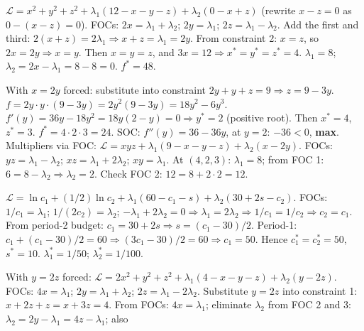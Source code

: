 \begin{solutions}
  \item $\mathcal{L} = x^2 + y^2 + z^2 + \lambda_1(12 - x - y - z)
        + \lambda_2(0 - x + z)$ (rewrite $x - z = 0$ as
        $0 - (x - z) = 0$). FOCs: $2 x = \lambda_1 + \lambda_2$;
        $2 y = \lambda_1$; $2 z = \lambda_1 - \lambda_2$. Add the first
        and third: $2(x + z) = 2 \lambda_1 \Rightarrow
        x + z = \lambda_1 = 2 y$. From constraint 2: $x = z$, so
        $2 x = 2 y \Rightarrow x = y$. Then $x = y = z$, and
        $3 x = 12 \Rightarrow x^* = y^* = z^* = 4$. $\lambda_1 = 8$;
        $\lambda_2 = 2 x - \lambda_1 = 8 - 8 = 0$. $f^* = 48$.
  \item With $x = 2 y$ forced: substitute into constraint
        $2 y + y + z = 9 \Rightarrow z = 9 - 3 y$.
        $f = 2 y \cdot y \cdot (9 - 3 y) = 2 y^2(9 - 3 y)
        = 18 y^2 - 6 y^3$.
        $f'(y) = 36 y - 18 y^2 = 18 y(2 - y) = 0 \Rightarrow y^* = 2$
        (positive root). Then $x^* = 4$, $z^* = 3$.
        $f^* = 4 \cdot 2 \cdot 3 = 24$. SOC: $f''(y) = 36 - 36 y$, at
        $y = 2$: $-36 < 0$, \textbf{max}. Multipliers via FOC:
        $\mathcal{L} = x y z + \lambda_1(9 - x - y - z)
        + \lambda_2(x - 2 y)$. FOCs: $y z = \lambda_1 - \lambda_2$;
        $x z = \lambda_1 + 2 \lambda_2$; $x y = \lambda_1$. At
        $(4, 2, 3)$: $\lambda_1 = 8$; from FOC 1:
        $6 = 8 - \lambda_2 \Rightarrow \lambda_2 = 2$. Check FOC 2:
        $12 = 8 + 2 \cdot 2 = 12$. \checkmark
  \item $\mathcal{L} = \ln c_1 + (1/2) \ln c_2
        + \lambda_1(60 - c_1 - s) + \lambda_2(30 + 2 s - c_2)$. FOCs:
        $1/c_1 = \lambda_1$; $1/(2 c_2) = \lambda_2$;
        $-\lambda_1 + 2 \lambda_2 = 0 \Rightarrow
        \lambda_1 = 2 \lambda_2 \Rightarrow 1/c_1 = 1/c_2 \Rightarrow
        c_2 = c_1$. From period-2 budget:
        $c_1 = 30 + 2 s \Rightarrow s = (c_1 - 30)/2$. Period-1:
        $c_1 + (c_1 - 30)/2 = 60 \Rightarrow (3 c_1 - 30)/2 = 60
        \Rightarrow c_1 = 50$. Hence $c_1^* = c_2^* = 50$, $s^* = 10$.
        $\lambda_1^* = 1/50$; $\lambda_2^* = 1/100$.
  \item With $y = 2 z$ forced: $\mathcal{L} = 2 x^2 + y^2 + z^2
        + \lambda_1(4 - x - y - z) + \lambda_2(y - 2 z)$. FOCs:
        $4 x = \lambda_1$; $2 y = \lambda_1 + \lambda_2$;
        $2 z = \lambda_1 - 2 \lambda_2$. Substitute $y = 2 z$ into
        constraint 1: $x + 2 z + z = x + 3 z = 4$. From FOCs:
        $4 x = \lambda_1$; eliminate $\lambda_2$ from FOC 2 and 3:
        $\lambda_2 = 2 y - \lambda_1 = 4 z - \lambda_1$; also

\end{solutions}
